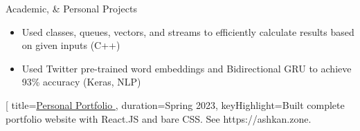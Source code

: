\documentclass{resume} %
\begin{document}
\begin{workSection}{Academic, \& Personal Projects}
    \customItem[
        title=\href{https://github.com/AshkanArabim/advent-of-code-2022}{Advent of Code 2022 \faExternalLink},
        duration=Summer 2023,
        keyHighlight=Coded C++ solutions to 12 of 25 Advent of Code 2022 challenges.
    ]
    \begin{itemize}
        \vspace{-0.5em}
        \itemsep -6pt {}
        \item Used classes, queues, vectors, and streams to efficiently calculate results based on given inputs (C++)
    \end{itemize}
    \customItem[
        title=\href{https://github.com/AshkanArabim/cybertweet-topics/tree/main}{Tweet topic detection \faExternalLink},
        duration=Summer 2023,
        keyHighlight=Built model to detect one of 8 cyber-security topics mentioned in Tweets.
    ]
    \begin{itemize}
        \vspace{-0.5em}
        \itemsep -6pt {}
        \item Used Twitter pre-trained word embeddings and Bidirectional GRU to achieve 93\% accuracy (Keras, NLP)
    \end{itemize}
    \customItem[
        title=\href{https://ashkan.zone/}{Personal Portfolio \faExternalLink},
        duration=Spring 2023,
        keyHighlight=Built complete portfolio website with React.JS and bare CSS. See https://ashkan.zone.

\end{workSection}
\end{document}
